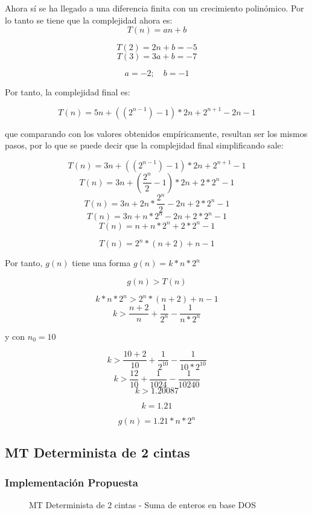 \documentclass{uc3mpracticas}
\begin{document}
    Ahora sí se ha llegado a una diferencia finita con un crecimiento polinómico. Por lo tanto se tiene que la complejidad ahora es:
    $$T(n) = an + b$$

    $$T(2) = 2n + b = -5$$
    $$T(3) = 3a + b = -7$$


    $$ a = -2 ;\quad b = -1$$

    Por tanto, la complejidad final es:

    $$ T(n) = 5n + ((2^{n-1}) - 1) * 2n + 2^{n+1} - 2n -1$$


    que comparando con los valores obtenidos empíricamente, resultan ser los mismos pasos, por lo que se puede decir que la complejidad final simplificando sale:

    $$T(n) = 3n + ((2^{n-1}) - 1) * 2n + 2^{n+1} - 1$$
    $$T(n) = 3n + (\frac{2^n}{2} - 1) * 2n + 2*2^n - 1$$
    $$T(n) = 3n + 2n*\frac{2^n}{2} - 2n + 2*2^n - 1$$
    $$T(n) = 3n + n*2^n - 2n + 2*2^n - 1$$
    $$T(n) = n + n*2^n + 2*2^n - 1$$



    $$T(n) = 2^n*(n + 2) + n - 1$$

    Por tanto, $g(n)$ tiene una forma $g(n) = k*n*2^n$

    $$g(n) > T(n)$$

    $$k*n*2^n > 2^n * (n + 2) + n - 1$$
    $$k > \frac{n + 2}{n} + \frac{1}{2^n} - \frac{1}{n*2^n}$$

    y con $n_0 = 10$

    $$k > \frac{10 + 2}{10} + \frac{1}{2^{10}} - \frac{1}{10*2^{10}}$$
    $$k > \frac{12}{10} + \frac{1}{1024} - \frac{1}{10240}$$
    $$k > 1.20087$$

    $$ k = 1.21$$

    $$g(n) = 1.21*n*2^n$$








  \subsection{MT Determinista de 2 cintas}

  \subsubsection{Implementación Propuesta}

  \begin{figure}[!h]
    \caption{MT Determinista de 2 cintas - Suma de enteros en base DOS}
  \end{figure}
\end{document}
